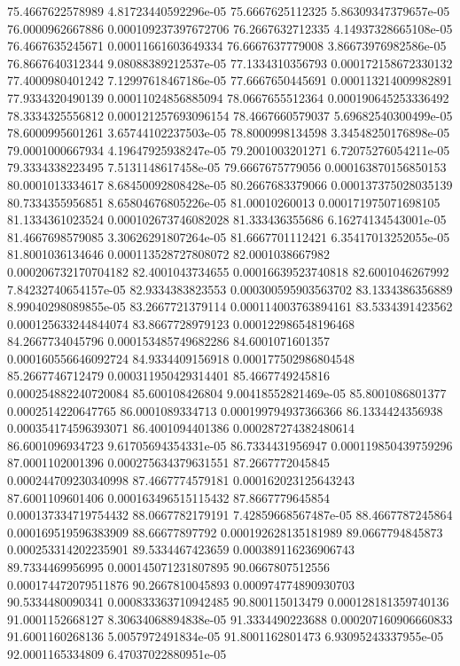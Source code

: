 {75.4667622578989 4.81723440592296e-05
75.6667625112325 5.86309347379657e-05
76.0000962667886 0.000109237397672706
76.2667632712335 4.14937328665108e-05
76.4667635245671 0.00011661603649334
76.6667637779008 3.86673976982586e-05
76.8667640312344 9.08088389212537e-05
77.1334310356793 0.000172158672330132
77.4000980401242 7.12997618467186e-05
77.6667650445691 0.000113214009982891
77.9334320490139 0.00011024856885094
78.0667655512364 0.000190645253336492
78.3334325556812 0.000121257693096154
78.4667660579037 5.69682540300499e-05
78.6000995601261 3.65744102237503e-05
78.8000998134598 3.34548250176898e-05
79.0001000667934 4.19647925938247e-05
79.2001003201271 6.72075276054211e-05
79.3334338223495 7.5131148617458e-05
79.6667675779056 0.000163870156850153
80.0001013334617 8.68450092808428e-05
80.2667683379066 0.000137375028035139
80.7334355956851 8.65804676805226e-05
81.00010260013 0.000171975071698105
81.1334361023524 0.000102673746082028
81.333436355686 6.16274134543001e-05
81.4667698579085 3.30626291807264e-05
81.6667701112421 6.35417013252055e-05
81.8001036134646 0.000113528727808072
82.0001038667982 0.000206732170704182
82.4001043734655 0.00016639523740818
82.6001046267992 7.84232740654157e-05
82.9334383823553 0.000300595903563702
83.1334386356889 8.99040298089855e-05
83.2667721379114 0.000114003763894161
83.5334391423562 0.000125633244844074
83.8667728979123 0.000122986548196468
84.2667734045796 0.000153485749682286
84.6001071601357 0.000160556646092724
84.9334409156918 0.000177502986804548
85.2667746712479 0.000311950429314401
85.4667749245816 0.000254882240720084
85.600108426804 9.00418552821469e-05
85.8001086801377 0.0002514220647765
86.0001089334713 0.000199794937366366
86.1334424356938 0.000354174596393071
86.4001094401386 0.000287274382480614
86.6001096934723 9.61705694354331e-05
86.7334431956947 0.000119850439759296
87.0001102001396 0.000275634379631551
87.2667772045845 0.000244709230340998
87.4667774579181 0.000162023125643243
87.6001109601406 0.000163496515115432
87.8667779645854 0.000137334719754432
88.0667782179191 7.42859668567487e-05
88.4667787245864 0.000169519596383909
88.66677897792 0.000192628135181989
89.0667794845873 0.000253314202235901
89.5334467423659 0.000389116236906743
89.7334469956995 0.000145071231807895
90.0667807512556 0.000174472079511876
90.2667810045893 0.000974774890930703
90.5334480090341 0.000833363710942485
90.800115013479 0.000128181359740136
91.0001152668127 8.30634068894838e-05
91.3334490223688 0.000207160906660833
91.6001160268136 5.0057972491834e-05
91.8001162801473 6.93095243337955e-05
92.0001165334809 6.47037022880951e-05
}

